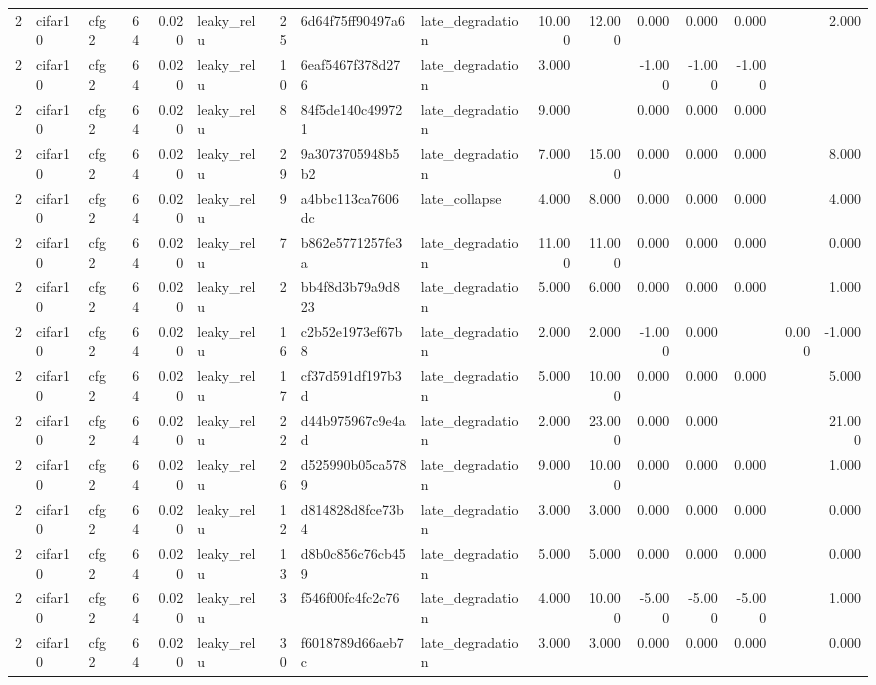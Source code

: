 \begin{table}[htbp]
{\begin{tabular}{@{}rllrrlrllrrrrrrr@{}}
2 & cifar10 & cfg2 & 64 & 0.020 & leaky\_relu & 25 & 6d64f75ff90497a6 & late\_degradation & 10.000 & 12.000 & 0.000 & 0.000 & 0.000 &  & 2.000 \\
2 & cifar10 & cfg2 & 64 & 0.020 & leaky\_relu & 10 & 6eaf5467f378d276 & late\_degradation & 3.000 &  & -1.000 & -1.000 & -1.000 &  &  \\
2 & cifar10 & cfg2 & 64 & 0.020 & leaky\_relu & 8 & 84f5de140c499721 & late\_degradation & 9.000 &  & 0.000 & 0.000 & 0.000 &  &  \\
2 & cifar10 & cfg2 & 64 & 0.020 & leaky\_relu & 29 & 9a3073705948b5b2 & late\_degradation & 7.000 & 15.000 & 0.000 & 0.000 & 0.000 &  & 8.000 \\
2 & cifar10 & cfg2 & 64 & 0.020 & leaky\_relu & 9 & a4bbc113ca7606dc & late\_collapse & 4.000 & 8.000 & 0.000 & 0.000 & 0.000 &  & 4.000 \\
2 & cifar10 & cfg2 & 64 & 0.020 & leaky\_relu & 7 & b862e5771257fe3a & late\_degradation & 11.000 & 11.000 & 0.000 & 0.000 & 0.000 &  & 0.000 \\
2 & cifar10 & cfg2 & 64 & 0.020 & leaky\_relu & 2 & bb4f8d3b79a9d823 & late\_degradation & 5.000 & 6.000 & 0.000 & 0.000 & 0.000 &  & 1.000 \\
2 & cifar10 & cfg2 & 64 & 0.020 & leaky\_relu & 16 & c2b52e1973ef67b8 & late\_degradation & 2.000 & 2.000 & -1.000 & 0.000 &  & 0.000 & -1.000 \\
2 & cifar10 & cfg2 & 64 & 0.020 & leaky\_relu & 17 & cf37d591df197b3d & late\_degradation & 5.000 & 10.000 & 0.000 & 0.000 & 0.000 &  & 5.000 \\
2 & cifar10 & cfg2 & 64 & 0.020 & leaky\_relu & 22 & d44b975967c9e4ad & late\_degradation & 2.000 & 23.000 & 0.000 & 0.000 &  &  & 21.000 \\
2 & cifar10 & cfg2 & 64 & 0.020 & leaky\_relu & 26 & d525990b05ca5789 & late\_degradation & 9.000 & 10.000 & 0.000 & 0.000 & 0.000 &  & 1.000 \\
2 & cifar10 & cfg2 & 64 & 0.020 & leaky\_relu & 12 & d814828d8fce73b4 & late\_degradation & 3.000 & 3.000 & 0.000 & 0.000 & 0.000 &  & 0.000 \\
2 & cifar10 & cfg2 & 64 & 0.020 & leaky\_relu & 13 & d8b0c856c76cb459 & late\_degradation & 5.000 & 5.000 & 0.000 & 0.000 & 0.000 &  & 0.000 \\
2 & cifar10 & cfg2 & 64 & 0.020 & leaky\_relu & 3 & f546f00fc4fc2c76 & late\_degradation & 4.000 & 10.000 & -5.000 & -5.000 & -5.000 &  & 1.000 \\
2 & cifar10 & cfg2 & 64 & 0.020 & leaky\_relu & 30 & f6018789d66aeb7c & late\_degradation & 3.000 & 3.000 & 0.000 & 0.000 & 0.000 &  & 0.000 \\

\end{tabular}}
\end{table}
